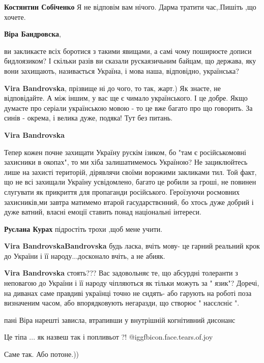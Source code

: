 \begin{itemize}
\begin{itemize}
\textbf{Костянтин Собіченко} Я не відповім вам нічого. Дарма тратити час,.Пишіть ,що хочете.

\textbf{Віра Бандровска}, 

ви закликаєте всіх боротися з такими явищами, а самі чому поширюєте дописи
бидлоязиком? І скільки разів ви сказали рускаязичьним байцам, що держава, яку
вони захищають, називається Україна, і мова наша, відповідно, українська?

\textbf{Vira Bandrovska}, прізвище ні до чого, то так, жарт.)
Як знаєте, не відповідайте.
А між іншим, у вас ще є чимало українського. І це добре. Якщо думаєте про серіали українською мовою - то це вже багато про що говорить.
За синів - окрема, і велика дуже, подяка! Тут без питань.

\textbf{Vira Bandrovska} 

Тепер кожен почне захищати Україну рускім ізиком, бо "там є російськомовні
захисники в окопах", то ми хіба залишатимемось Україною? Не зациклюйтесь лише
на захисті територій, дірявлячи своїми ворожими закликами тил. Той факт, що не
всі захищали Україну усвідомлено, багато це робили за гроші, не повинен
слугувати як прикриття для пропаганди російського. Героїзуючи росмовних
захисників,ми завтра матимемо втарой гасударствєнний, бо хтось дуже добрий і
дуже ватний, власні емоції ставить понад національні інтереси.

\textbf{Руслана Курах} підростіть трохи ,щоб мене учити.

\textbf{Vira Bandrovska}\textbf{Bandrovska} будь ласка, вчіть мову- це гарний реальний крок до України і її народу...досконало вчіть, а не абияк.

\textbf{Vira Bandrovska} стоять??? Вас задовольняє те, що абсурдні толеранти з
неповагою до України і її народу чіпляються як тільки можуть за " язик"?
Доречі, на диванах саме правдиві українці точно не сидять- або гарують на
роботі поза визначеним часом, або впорядковують негаразди, що створює "
насєлєніє ".

пані Віра нарешті зависла, втрапивши у внутрішній когнітивний дисонанс

\end{itemize} %

Це тіпа ... як назвеш так і попливьот ?!  @igg{fbicon.face.tears.of.joy} 

\begin{itemize} %
Саме так. Або потоне.))


\end{itemize}
\end{itemize}
